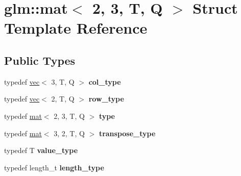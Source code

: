 \hypertarget{structglm_1_1mat_3_012_00_013_00_01T_00_01Q_01_4}{}\section{glm\+:\+:mat$<$ 2, 3, T, Q $>$ Struct Template Reference}
\label{structglm_1_1mat_3_012_00_013_00_01T_00_01Q_01_4}
\subsection*{Public Types}
\begin{DoxyCompactItemize}
\item 
\mbox{\label{structglm_1_1mat_3_012_00_013_00_01T_00_01Q_01_4_aebe4faf14ea1bc3092b4bbf591d7194e}} 
typedef \hyperlink{structglm_1_1vec}{vec}$<$ 3, T, Q $>$ {\bfseries col\+\_\+type}
\item 
\mbox{\label{structglm_1_1mat_3_012_00_013_00_01T_00_01Q_01_4_a94cb8478500cfb7249eadf766b9e64f1}} 
typedef \hyperlink{structglm_1_1vec}{vec}$<$ 2, T, Q $>$ {\bfseries row\+\_\+type}
\item 
\mbox{\label{structglm_1_1mat_3_012_00_013_00_01T_00_01Q_01_4_a8a283bdf36e731e243e185a5dc783070}} 
typedef \hyperlink{structglm_1_1mat}{mat}$<$ 2, 3, T, Q $>$ {\bfseries type}
\item 
\mbox{\label{structglm_1_1mat_3_012_00_013_00_01T_00_01Q_01_4_a5e827ce80d430334f2815fa8eb6aeb06}} 
typedef \hyperlink{structglm_1_1mat}{mat}$<$ 3, 2, T, Q $>$ {\bfseries transpose\+\_\+type}
\item 
\mbox{\label{structglm_1_1mat_3_012_00_013_00_01T_00_01Q_01_4_a16f6111e5e9f3d29da5926277e63f668}} 
typedef T {\bfseries value\+\_\+type}
\item 
\mbox{\label{structglm_1_1mat_3_012_00_013_00_01T_00_01Q_01_4_ad2e2433ba375abcd6bada873f8ea2de1}} 
typedef length\+\_\+t {\bfseries length\+\_\+type}
\end{DoxyCompactItemize}
